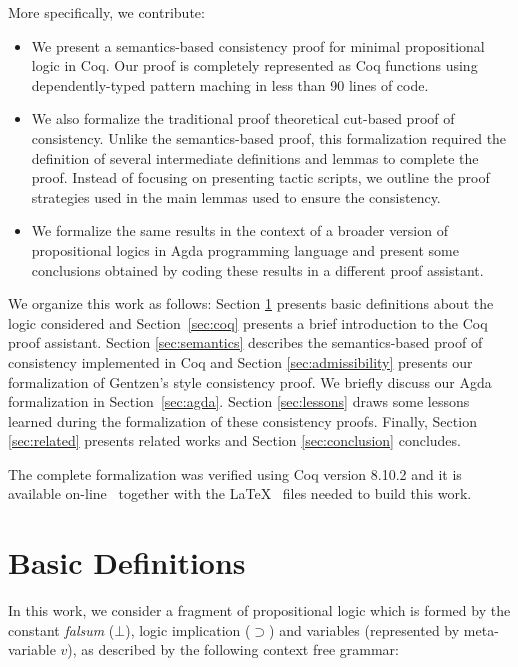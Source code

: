 More specifically, we contribute:


\begin{itemize}
   \item We present a semantics-based consistency proof for minimal propositional logic in Coq.
   Our proof is completely represented as Coq functions using dependently-typed pattern maching
   in less than 90 lines of code.
   \item We also formalize the traditional proof theoretical cut-based proof of consistency. Unlike the semantics-based
   proof, this formalization required the definition of several intermediate definitions and lemmas to complete the proof.
   Instead of focusing on presenting tactic scripts, we outline the proof strategies used in the main lemmas used to ensure
   the consistency.
   \item We formalize the same results in the context of a broader version of propositional logics in Agda
   programming language and present some conclusions obtained by coding these results in a different proof assistant.
\end{itemize}


We organize this work as follows: Section \ref{sec:definitions} presents basic definitions
about the logic considered and Section~\ref{sec:coq} presents a brief introduction to the Coq proof assistant.
Section \ref{sec:semantics} describes the semantics-based proof of consistency
implemented in  Coq and Section \ref{sec:admissibility} presents our formalization of Gentzen's style consistency proof.
We briefly discuss our Agda formalization in Section~\ref{sec:agda}.
Section \ref{sec:lessons} draws some lessons learned during the formalization of these consistency proofs.
Finally, Section \ref{sec:related} presents related works and Section \ref{sec:conclusion} concludes.


The complete formalization was verified using Coq version 8.10.2 and it is available
on-line~\cite{Sasdelli20} together with the \LaTeX~ files needed to build this work.


\section{Basic Definitions}\label{sec:definitions}


In this work, we consider a fragment of propositional logic which is formed by the constant
\emph{falsum} ($\bot$), logic implication ($\supset$) and variables (represented by meta-variable $v$), as
described by the following context free grammar:

